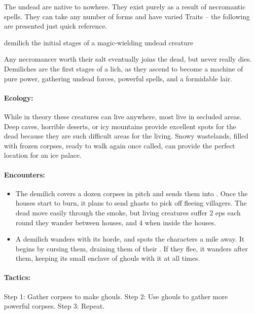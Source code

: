 \begin{multicols}{2}

\noindent
The undead are native to nowhere.
They exist purely as a result of necromantic spells.
They can take any number of forms and have varied Traits -- the following are presented just quick reference.


  {demilich}%
  {the initial stages of a magic-wielding undead creature}%

Any necromancer worth their salt eventually joins the dead, but never really dies.
Demiliches are the first stages of a lich, as they ascend to become a machine of pure power, gathering undead forces, powerful spells, and a formidable lair.

\paragraph{Ecology:} While in theory these creatures can live anywhere, most live in secluded areas.
Deep caves, horrible deserts, or icy mountains provide excellent spots for the dead because they are such difficult areas for the living.
Snowy wastelands, filled with frozen corpses, ready to walk again once called, can provide the perfect location for an ice palace.

\paragraph{Encounters:}

\begin{itemize}

  \item
  The demilich covers a dozen corpses in pitch and sends them into .
  Once the houses start to burn, it plans to send ghasts to pick off fleeing villagers.
  The dead move easily through the smoke, but living creatures suffer 2 \glspl{ep} each round they wander between houses, and 4 when inside the houses.
  \item
  A demilich wanders with its horde, and spots the characters a mile away.
  It begins by cursing them, draining them of their .
  If they flee, it wanders after them, keeping its small enclave of ghouls with it at all times.

\end{itemize}

\paragraph{Tactics:}
Step 1: Gather corpses to make ghouls.
Step 2: Use ghouls to gather more powerful corpses.
Step 3: Repeat.


\end{multicols}
